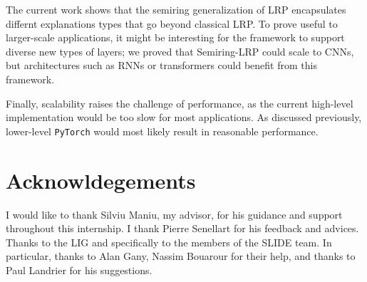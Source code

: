 \documentclass[twocolumn]{../cs-classes/cs-classes}
\newcommand*{\1}{\digitsbb{1}}
\newcommand*{\0}{\digitsbb{0}}
\begin{document}
The current work shows that the semiring generalization of LRP encapsulates differnt explanations types that go beyond classical LRP. To prove useful to larger-scale applications, it might be interesting for the framework to support diverse new types of layers; we proved that Semiring-LRP could scale to CNNs, but architectures such as RNNs or transformers could benefit from this framework.

Finally, scalability raises the challenge of performance, as the current high-level implementation would be too slow for most applications. As discussed previously, lower-level \texttt{PyTorch} would most likely result in reasonable performance.




\section*{Acknowldegements}
I would like to thank Silviu Maniu, my advisor, for his guidance and support throughout this internship. I thank Pierre Senellart for his feedback and advices. Thanks to the LIG and specifically to the members of the SLIDE team. In particular, thanks to Alan Gany, Nassim Bouarour for their help, and thanks to Paul Landrier for his suggestions.

\nocite{*}
\printbibliography

\newpage
\vfill\null
\newpage

\begingroup
\hypersetup{hidelinks}
\tableofcontents
\newpage
\listoffigures
\endgroup

\appendix
\end{document}
